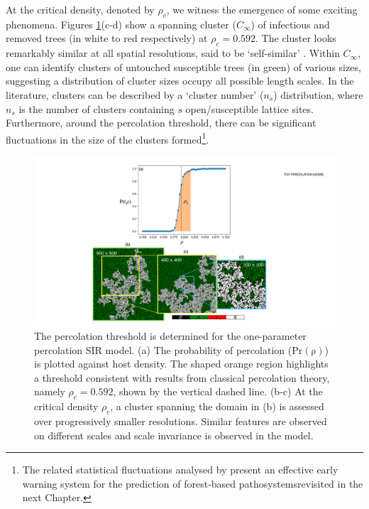 At the critical density, denoted by $\rho_c$, we witness the emergence of some exciting phenomena.
Figures \ref{fig:ch3-perc}(c-d) show a spanning cluster ($C_\infty$) of infectious and removed trees (in white to red respectively) at $\rho_c=0.592$.
The cluster looks remarkably similar at all spatial resolutions, said to be `self-similar' \cite{Kapitulnik_1983}.
Within $C_\infty$, one can identify clusters of untouched susceptible trees (in green) of various sizes, suggesting a distribution of cluster sizes occupy all possible length scales.
In the literature, clusters can be described by a `cluster number' ($n_s$) distribution, where $n_s$ is the number of clusters containing $s$ open/susceptible lattice sites.
Furthermore, around the percolation threshold, there can be significant fluctuations in the size of the clusters formed\footnote{
The related statistical fluctuations analysed by \cite{OROZCOFUENTES201912}
present an effective early warning system for the prediction of forest-based pathosystems\textemdash revisited in the next Chapter.
}.

\begin{figure}
    \centering
    \includegraphics[scale=0.4]{chapter3/figures/figure2-1param-perc-threshold.pdf}
    \caption{The percolation threshold is determined for the one-parameter percolation SIR model.
            (a) The probability of percolation ($\mathrm{Pr(\rho)}$) is plotted against host density.
            The shaped orange region highlights a threshold consistent with results from classical percolation theory, 
            namely $\rho_c = 0.592$, shown by the vertical dashed line. 
            (b-c) At the critical density $\rho_c$, a cluster spanning the domain in (b) is assessed over progressively smaller resolutions.
            Similar features are observed on different scales and scale invariance is observed in the model.
            }
    \label{fig:ch3-perc}
\end{figure}

